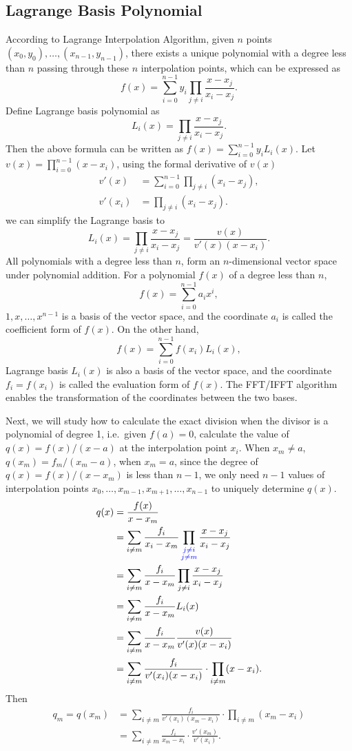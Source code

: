 \subsection{Lagrange Basis Polynomial}

According to Lagrange Interpolation Algorithm, given $n$ points $(x_0,y_0),\ldots,(x_{n-1},y_{n-1})$, there exists a unique polynomial with a degree less than $n$ passing through these $n$ interpolation points, which can be expressed as
\[ f(x) = \sum_{i=0}^{n-1} y_i \prod_{j \ne i} \frac{x-x_j}{x_i-x_j}. \]
Define Lagrange basis polynomial as
\[ L_i(x) = \prod_{j \ne i} \frac{x-x_j}{x_i-x_j}. \]
Then the above formula can be written as $f(x)=\sum_{i=0}^{n-1}y_iL_i(x)$. Let $v(x)=\prod_{i=0}^{n-1}(x-x_i)$, using the formal derivative of $v(x)$
\begin{align*}
    v'(x) &= \sum_{i=0}^{n-1}\prod_{j \ne i}(x_i-x_j), \\
    v'(x_i) &= \prod_{j \ne i}(x_i-x_j).
\end{align*}
we can simplify the Lagrange basis to
\[ L_i(x) = \prod_{j \ne i}\frac{x-x_j}{x_i-x_j} = \frac{v(x)}{v'(x)(x-x_i)}. \]
All polynomials with a degree less than $n$, form an $n$-dimensional vector space under polynomial addition. For a polynomial $f(x)$ of a degree less than $n$, \[ f(x) = \sum_{i=0}^{n-1} a_ix^i, \]
$1,x,\ldots,x^{n-1}$ is a basis of the vector space, and the coordinate $a_i$ is called the coefficient form of $f(x)$. On the other hand, \[ f(x) = \sum_{i=0}^{n-1}f(x_i)L_i(x), \]
Lagrange basis $L_i(x)$ is also a basis of the vector space, and the coordinate $f_i=f(x_i)$ is called the evaluation form of $f(x)$.
The FFT/IFFT algorithm enables the transformation of the coordinates between the two bases.

Next, we will study how to calculate {\Update the} exact division when the divisor is a polynomial of degree 1, i.e.\ given $f(a)=0$, calculate the value of $q(x)=f(x)/(x-a)$ at the interpolation point $x_i$.
When $x_m \ne a$, $q(x_m)=f_m/(x_m-a)$, when $x_m=a$, since the degree of $q(x)=f(x)/(x-x_m)$ is less than $n-1$, we only need $n-1$ values of interpolation points $x_0,\ldots,x_{m-1} ,x_{m+1},\ldots,x_{n-1}$ to uniquely determine $q(x)$.
\begin{align*}
    q(x) &= \frac{f(x)}{x-x_m} \\
    &= \sum_{i \ne m} \frac{f_i}{x_i-x_m} \prod_{{\color{blue} \substack{j \ne i \\ j \ne m}}} \frac{x-x_j}{x_i-x_j} \\
    &= \sum_{i \ne m} \frac{f_i}{x-x_m} \prod_{j \ne i} \frac{x-x_j}{x_i-x_j} \\
    &= \sum_{i \ne m} \frac{f_i}{x-x_m} L_i(x) \\
    &= \sum_{i \ne m} \frac{f_i}{x-x_m} \frac{v(x)}{v'(x)(x-x_i)} \\
    &= \sum_{i \ne m} \frac{f_i}{v'(x_i)(x-x_i)} \cdot \prod_{i \ne m}(x-x_i).
\end{align*}
Then
\begin{align*}
    q_m = q(x_m) &= \sum_{i \ne m} \frac{f_i}{v'(x_i)(x_m-x_i)} \cdot \prod_{i \ne m}(x_m-x_i) \\
    &= \sum_{i \ne m} \frac{f_i}{x_m-x_i} \cdot \frac{v'(x_m)}{v'(x_i)}.
\end{align*}

